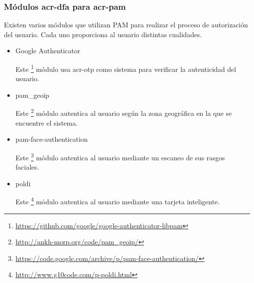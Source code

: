 \documentclass[titlepage, 12pt, a4paper]{article}
\begin{document}
{\subsubsection{Módulos \gls{acr-dfa} para \gls{acr-pam}}
Existen varios módulos que utilizan PAM para realizar el proceso de autorización del usuario. Cada uno proporciona al usuario distintas cualidades.
\begin{itemize}
	\item{Google Authenticator}\par
	Este \footnote{\url{https://github.com/google/google-authenticator-libpam}} módulo usa \gls{acr-otp} como sistema para verificar la autenticidad del usuario.
	\item{pam\_geoip}\par
	Este \footnote{\url{http://ankh-morp.org/code/pam_geoip/}} módulo autentica al usuario según la zona geográfica en la que se encuentre el sistema.
	\item{pam-face-authentication} \par
	Este \footnote{\url{https://code.google.com/archive/p/pam-face-authentication/}} módulo autentica al usuario mediante un escaneo de sus rasgos faciales.
	\item{poldi} \par
	Este \footnote{\url{http://www.g10code.com/p-poldi.html}} módulo autentica al usuario mediante una tarjeta inteligente.
\end{itemize}
}
\end{document}
